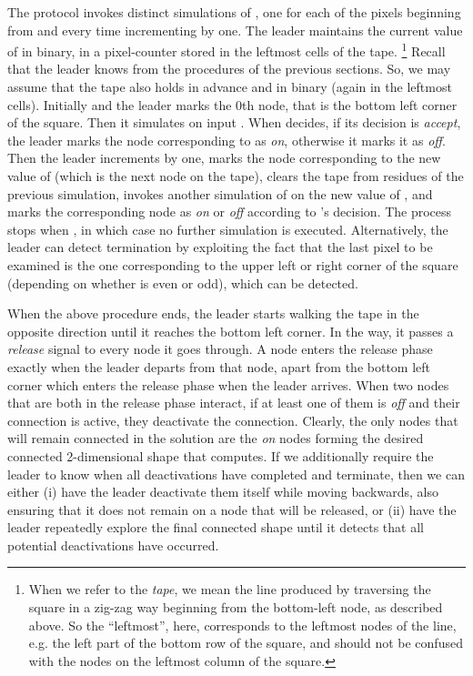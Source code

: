 \documentclass[oribibl, 11pt]{llncs}
\begin{document}
The protocol invokes  distinct simulations of , one for each of the pixels  beginning from  and every time incrementing  by one. The leader maintains the current value of  in binary, in a pixel-counter  stored in the  leftmost cells of the tape. \footnote{When we refer to the \emph{tape}, we mean the line produced by traversing the square in a zig-zag way beginning from the bottom-left node, as described above. So the ``leftmost'', here, corresponds to the leftmost nodes of the line, e.g. the left part of the bottom row of the square, and should not be confused with the nodes on the leftmost column of the square.} Recall that the leader knows  from the procedures of the previous sections. So, we may assume that the tape also holds in advance  and  in binary (again in the leftmost cells). Initially  and the leader marks the 0th node, that is the bottom left corner of the square. Then it simulates  on input . When  decides, if its decision is \emph{accept}, the leader marks the node corresponding to  as \emph{on}, otherwise it marks it as \emph{off}. Then the leader increments  by one, marks the node corresponding to the new value of  (which is the next node on the tape), clears the tape from residues of the previous simulation, invokes another simulation of  on the new value of , and marks the corresponding node as \emph{on} or \emph{off} according to 's decision. The process stops when , in which case no further simulation is executed. Alternatively, the leader can detect termination by exploiting the fact that the last pixel to be examined is the one corresponding to the upper left or right corner of the square (depending on whether  is even or odd), which can be detected.

When the above procedure ends, the leader starts walking the tape in the opposite direction until it reaches the bottom left corner. In the way, it passes a \emph{release} signal to every node it goes through. A node enters the release phase exactly when the leader departs from that node, apart from the bottom left corner which enters the release phase when the leader arrives. When two nodes that are both in the release phase interact, if at least one of them is \emph{off} and their connection is active, they deactivate the connection. Clearly, the only nodes that will remain connected in the solution are the \emph{on} nodes forming the desired connected 2-dimensional shape that  computes. If we additionally require the leader to know when all deactivations have completed and terminate, then we can either (i) have the leader deactivate them itself while moving backwards, also ensuring that it does not remain on a node that will be released, or (ii) have the leader repeatedly explore the final connected shape until it detects that all potential deactivations have occurred.
\end{document}
